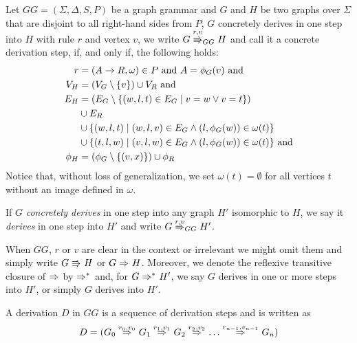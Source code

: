 \documentclass[]{report}
\begin{document}
\begin{definition}
	\label{def:gg_dstep}
	Let $GG = (\Sigma, \Delta, S, P)$ be a graph grammar and $G$ and $H$ be two graphs over $\Sigma$ that are disjoint to all right-hand sides from $P$, $G$ concretely derives in one step into $H$ with rule $r$ and vertex $v$, we write $G \cderiv{r}{v}{GG} H$ and call it a concrete derivation step, if, and only if, the following holds:
	\begin{align*}
		r & = (A \to R, \omega) \in P \text{ and } A = \phi_G(v) \text{ and} \\
		V_H  & = (V_G \setminus \{v\}) \cup V_R \text{ and} \\
		E_H & = (E_G \setminus \{(w,l,t) \in E_G \; | \; v = w \lor v = t\}) \\
		& \cup E_R \\
		& \cup \{(w,l,t) \; | \; (w,l,v) \in E_G \land (l,\phi_G(w)) \in \omega(t)\} \\
		& \cup \{(t,l,w) \; | \; (v,l,w) \in E_G \land (l,\phi_G(w)) \in \omega(t)\} \text{ and} \\
		\phi_H & = (\phi_G \setminus \{(v,x)\}) \cup \phi_R
	\end{align*}
	Notice that, without loss of generalization, we set $\omega(t) = \emptyset$ for all vertices $t$ without an image defined in $\omega$.
	
	If $G$ \textit{concretely derives} in one step into any graph $H'$ isomorphic to $H$, we say it \textit{derives} in one step into $H'$ and write $G \deriv{r}{v}{GG} H'$. 
	
	When $GG$, $r$ or $v$ are clear in the context or irrelevant we might omit them and simply write $G \cderiv{}{}{} H$ or $G \deriv{}{}{} H$. Moreover, we denote the reflexive transitive closure of $\deriv{}{}{}$ by $\derivtr{}{}{}$ and, for $G \derivtr{}{}{} H'$, we say $G$ derives in one or more steps into $H'$, or simply $G$ derives into $H'$.
\end{definition}


\begin{definition}
	A derivation $D$ in $GG$ is a sequence of derivation steps and is written as
	\[ 
		D = (G_0 \deriv{r_0}{v_0}{} G_1 \deriv{r_1}{v_1}{} G_2 \deriv{r_2}{v_2}{} \dots \deriv{r_{n-1}}{v_{n-1}}{} G_n)
	\]
\end{definition}
\end{document}
